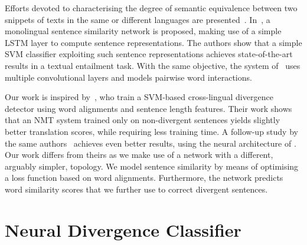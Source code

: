 \documentclass[11pt,a4paper]{article}
\begin{document}
Efforts devoted to characterising the degree of semantic equivalence between two snippets of texts in the same or different languages are presented~\cite{conf/semeval/AgirreBCDGMRW16}. %
In~\cite{Mueller:2016:SRA:3016100.3016291}, a monolingual sentence similarity network is proposed, making use of a simple LSTM layer to compute sentence representations. 
The authors show that a simple SVM classifier exploiting such sentence representations achieves state-of-the-art results in a textual entailment task. 
With the same objective, the system of~\citet{N16-1108} uses multiple convolutional layers and models pairwise word interactions. %

Our work is inspired by~\citet{W17-3209}, who train a SVM-based cross-lingual divergence detector using word alignments and sentence length features. 
Their work shows that an NMT system trained only on non-divergent sentences yields slightly better translation scores, while requiring less training time. 
A follow-up study by the same authors~\cite{N18-1136} achieves even better results, using the neural architecture of \citet{N16-1108}.
Our work differs from theirs as we make use of a network with a different, arguably simpler, topology. 
We model sentence similarity by means of optimising a loss function based on word alignments. 
Furthermore, the network predicts word similarity scores that we further use to correct divergent sentences.

\section{Neural Divergence Classifier}
\label{sec:divergence}
\end{document}
